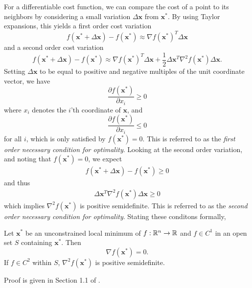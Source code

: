 For a differentiable cost function, we can compare the cost of a point to its neighbors by considering a small variation $\Delta \bm{x}$ from $\bm{x}^*$. By using Taylor expansions, this yields a first order cost variation
\begin{equation}
    f(\bm{x}^* + \Delta \bm{x}) - f(\bm{x}^*) \approx \nabla f(\bm{x}^*)^T \Delta \bm{x}
\end{equation}
and a second order cost variation 
\begin{equation}
    f(\bm{x}^* + \Delta \bm{x}) - f(\bm{x}^*) \approx \nabla f(\bm{x}^*)^T \Delta \bm{x} + \frac{1}{2} \Delta \bm{x}^T \nabla^2 f(\bm{x}^*) \Delta \bm{x}.
\end{equation}
Setting $\Delta \bm{x}$ to be equal to positive and negative multiples of the unit coordinate vector, we have 
\begin{equation}
    \frac{\partial f(\bm{x}^*)}{\partial x_i} \geq 0
\end{equation}
where $x_i$ denotes the $i$'th coordinate of $\bm{x}$, and 
\begin{equation}
    \frac{\partial f(\bm{x}^*)}{\partial x_i} \leq 0
\end{equation}
for all $i$, which is only satisfied by $f(\bm{x}^*) = 0$.  This is referred to as the \textit{first order necessary condition for optimality}. Looking at the second order variation, and noting that $f(\bm{x}^*) = 0$, we expect
\begin{align}
f(\bm{x}^* + \Delta \bm{x}) - f(\bm{x}^*) \geq 0
\end{align}
and thus
\begin{align}
\Delta \bm{x}^T \nabla^2 f(\bm{x}^*) \Delta \bm{x} \geq 0
\end{align}
which implies $\nabla^2 f(\bm{x}^*)$ is positive semidefinite. This is referred to as the \textit{second order necessary condition for optimality}. Stating these conditons formally, 

\begin{theorem}
Let $\bm{x}^*$ be an unconstrained local minimum of $f:\mathbb{R}^n \to \mathbb{R}$ and $f \in C^1$ in an open set $S$ containing $\bm{x}^*$. Then
\begin{equation}
    \nabla f(\bm{x}^*) = 0.
\end{equation}
If $f \in C^2$ within $S$, $\nabla^2 f(\bm{x}^*)$ is positive semidefinite. 
\end{theorem}

Proof is given in Section 1.1 of \cite{bertsekas2016nonlinear}.

